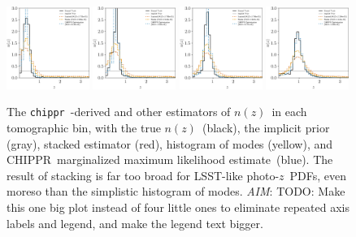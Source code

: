 \documentclass[iop]{emulateapj}
\newcommand{\todo}[3]{{\color{#2}\emph{#1}: #3}}
\newcommand{\aim}[1]{\todo{AIM}{red}{#1}}
\newcommand{\project}[1]{{\textsc{#1}}}
\newcommand{\lsst}{\project{LSST}}
\newcommand{\Chippr}{\project{CHIPPR}}
\newcommand{\repo}[1]{{\texttt{#1}}~}
\newcommand{\chippr}{\repo{chippr}}
\newcommand{\nz}{$n(z)$}
\newcommand{\pz}{photo-$z$~}
\newcommand{\pzpdf}{\pz PDF}
\newcommand{\mmle}{marginalized maximum likelihood estimate}
\begin{document}
\begin{figure}
	\begin{center}
		\includegraphics[width=0.24\textwidth]{figures/chippr/0single_lsst_lin_estimators.png}
		\includegraphics[width=0.24\textwidth]{figures/chippr/1single_lsst_lin_estimators.png}
		\includegraphics[width=0.24\textwidth]{figures/chippr/2single_lsst_lin_estimators.png}
		\includegraphics[width=0.24\textwidth]{figures/chippr/3single_lsst_lin_estimators.png}
		\caption{
			The \chippr-derived and other estimators of \nz\ in each tomographic bin, with the true \nz\ (black), the implicit prior (gray), stacked estimator (red), histogram of modes (yellow), and \Chippr\ \mmle\ (blue).
			The result of stacking is far too broad for \lsst-like \pzpdf s, even moreso than the simplistic histogram of modes.
			\aim{TODO: Make this one big plot instead of four little ones to eliminate repeated axis labels and legend, and make the legend text bigger.}
		}
		\label{fig:per-bin-ests}
	\end{center}
\end{figure}
\end{document}

